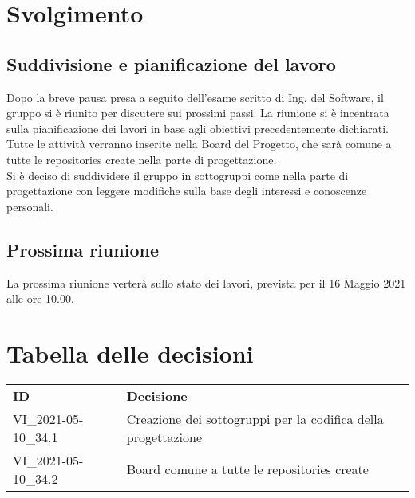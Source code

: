 \documentclass[]{article}
\begin{document}
	\newpage

	\section{Svolgimento}
	
	\subsection{Suddivisione e pianificazione del lavoro}
	Dopo la breve pausa presa a seguito dell'esame scritto di Ing. del Software, il gruppo si è riunito per discutere sui prossimi passi. La riunione si è incentrata sulla pianificazione dei lavori in base agli obiettivi precedentemente dichiarati.\\
	Tutte le attività verranno inserite nella Board del Progetto, che sarà comune a tutte le repositories create nella parte di progettazione.\\
	Si è deciso di suddividere il gruppo in sottogruppi come nella parte di progettazione con leggere modifiche sulla base degli interessi e conoscenze personali.
	
	
	\subsection{Prossima riunione}
La prossima riunione verterà sullo stato dei lavori, prevista per il 16 Maggio 2021 alle ore 10.00.

	\section{Tabella delle decisioni}

	\begin{table} [h!]
		\begin{center}
			\begin{tabular} { m{2cm} m{14cm} }
				\rowcolor{lightgray}
				\textbf{ID} & \textbf{Decisione}\\
				VI_2021-05-10_34.1 & Creazione dei sottogruppi per la codifica della progettazione \\
				VI_2021-05-10_34.2 & Board comune a tutte le repositories create\\
			\end{tabular}
		\end{center}
	\end{table}
\end{document}

